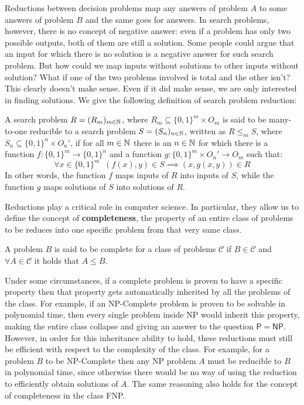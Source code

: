 Reductions between decision problems map any  answers of problem $A$ to some  answers of problem $B$ and the same goes for  answers. In search problems, however, there is no concept of negative answer: even if a problem has only two possible outputs, both of them are still a solution. Some people could argue that an input for which there is no solution is a negative answer for such search problem. But how could we map inputs without solutions to other inputs without solution? What if one of the two problems involved is total and the other isn't? This clearly doesn't make sense. Even if it did make sense, we are only interested in finding solutions. We give the following definition of search problem reduction:

\begin{definition}
    A search problem $R = (R_m)_{m \in \mathbb{N}}$, where $R_m \subseteq \{0,1\}^m \times O_m$ is said to be many-to-one reducible to a search problem $S = (S_n)_{n \in \mathbb{N}}$, written as $R \leq_m S$, where $S_n \subseteq \{0,1\}^n \times O_n'$, if for all $m \in \mathbb{N}$ there is an $n \in \mathbb{N}$ for which there is a function $f : \{0,1\}^m \to \{0,1\}^n$ and a function $g : \{0,1\}^m \times O_n' \to O_m$ such that:
    \[\forall x \in \{0,1\}^m \;\; (f(x), y) \in S \implies (x, g(x,y)) \in R\]
    In other words, the function $f$ maps inputs of $R$ into inputs of $S$, while the function $g$ maps solutions of $S$ into solutions of $R$. 
\end{definition}

\newpage

Reductions play a critical role in computer science. In particular, they allow us to define the concept of \textbf{completeness}, the property of an entire class of problems to be reduces into one specific problem from that very same class.

\begin{definition}
    A problem $B$ is said to be complete for a class of problems $\mathcal{C}$ if $B \in \mathcal{C}$ and $\forall A \in \mathcal{C}$ it holds that $A \leq B$.
\end{definition}

Under some circumstances, if a complete problem is proven to have a specific property then that property gets automatically inherited by all the problems of the class. For example, if an \textsf{NP}-Complete problem is proven to be solvable in polynomial time, then every single problem inside \textsf{NP} would inherit this property, making the entire class collapse and giving an answer to the question $\mathsf{P} = \mathsf{NP}$. However, in order for this inheritance ability to hold, these reductions must still be efficient with respect to the complexity of the class. For example, for a problem $B$ to be \textsf{NP}-Complete then any \textsf{NP} problem $A$ must be reducible to $B$ in polynomial time, since otherwise there would be no way of using the reduction to efficiently obtain solutions of $A$. The same reasoning also holds for the concept of completeness in the class \textsf{FNP}.

